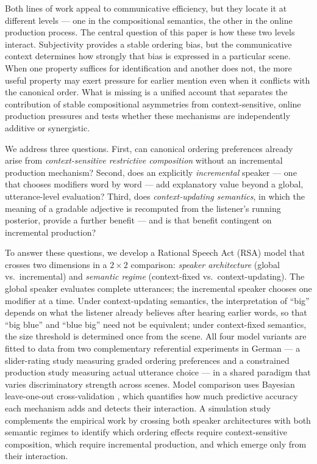 \documentclass[man,floatsintext]{apa7}
\begin{document}
Both lines of work appeal to communicative efficiency, but they locate it at different levels --- one in the compositional semantics, the other in the online production process.
The central question of this paper is how these two levels interact.
Subjectivity provides a stable ordering bias, but the communicative context determines how strongly that bias is expressed in a particular scene.
When one property suffices for identification and another does not, the more useful property may exert pressure for earlier mention even when it conflicts with the canonical order.
What is missing is a unified account that separates the contribution of stable compositional asymmetries from context-sensitive, online production pressures and tests whether these mechanisms are independently additive or synergistic.

We address three questions.
First, can canonical ordering preferences already arise from \emph{context-sensitive restrictive composition} without an incremental production mechanism?
Second, does an explicitly \emph{incremental} speaker --- one that chooses modifiers word by word --- add explanatory value beyond a global, utterance-level evaluation?
Third, does \emph{context-updating semantics}, in which the meaning of a gradable adjective is recomputed from the listener's running posterior, provide a further benefit --- and is that benefit contingent on incremental production?

To answer these questions, we develop a Rational Speech Act (RSA) model \citep{goodman2016pragmatic,degen2023rational} that crosses two dimensions in a $2 \times 2$ comparison: \emph{speaker architecture} (global vs.\ incremental) and \emph{semantic regime} (context-fixed vs.\ context-updating).
The global speaker evaluates complete utterances; the incremental speaker chooses one modifier at a time.
Under context-updating semantics, the interpretation of ``big'' depends on what the listener already believes after hearing earlier words, so that ``big blue'' and ``blue big'' need not be equivalent; under context-fixed semantics, the size threshold is determined once from the scene.
All four model variants are fitted to data from two complementary referential experiments in German --- a slider-rating study measuring graded ordering preferences and a constrained production study measuring actual utterance choice --- in a shared paradigm that varies discriminatory strength across scenes.
Model comparison uses Bayesian leave-one-out cross-validation \citep[PSIS-LOO;][]{vehtari2017practical}, which quantifies how much predictive accuracy each mechanism adds and detects their interaction.
A simulation study complements the empirical work by crossing both speaker architectures with both semantic regimes to identify which ordering effects require context-sensitive composition, which require incremental production, and which emerge only from their interaction.
\end{document}
